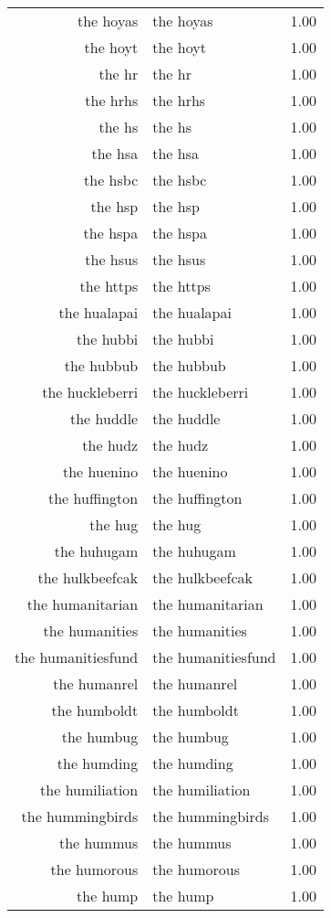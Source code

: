 \begin{table}[ht]
\begin{tabular}{rlr}
  the hoyas & the hoyas & 1.00 \\ 
  the hoyt & the hoyt & 1.00 \\ 
  the hr & the hr & 1.00 \\ 
  the hrhs & the hrhs & 1.00 \\ 
  the hs & the hs & 1.00 \\ 
  the hsa & the hsa & 1.00 \\ 
  the hsbc & the hsbc & 1.00 \\ 
  the hsp & the hsp & 1.00 \\ 
  the hspa & the hspa & 1.00 \\ 
  the hsus & the hsus & 1.00 \\ 
  the https & the https & 1.00 \\ 
  the hualapai & the hualapai & 1.00 \\ 
  the hubbi & the hubbi & 1.00 \\ 
  the hubbub & the hubbub & 1.00 \\ 
  the huckleberri & the huckleberri & 1.00 \\ 
  the huddle & the huddle & 1.00 \\ 
  the hudz & the hudz & 1.00 \\ 
  the huenino & the huenino & 1.00 \\ 
  the huffington & the huffington & 1.00 \\ 
  the hug & the hug & 1.00 \\ 
  the huhugam & the huhugam & 1.00 \\ 
  the hulkbeefcak & the hulkbeefcak & 1.00 \\ 
  the humanitarian & the humanitarian & 1.00 \\ 
  the humanities & the humanities & 1.00 \\ 
  the humanitiesfund & the humanitiesfund & 1.00 \\ 
  the humanrel & the humanrel & 1.00 \\ 
  the humboldt & the humboldt & 1.00 \\ 
  the humbug & the humbug & 1.00 \\ 
  the humding & the humding & 1.00 \\ 
  the humiliation & the humiliation & 1.00 \\ 
  the hummingbirds & the hummingbirds & 1.00 \\ 
  the hummus & the hummus & 1.00 \\ 
  the humorous & the humorous & 1.00 \\ 
  the hump & the hump & 1.00 \\ 

\end{tabular}
\end{table}

